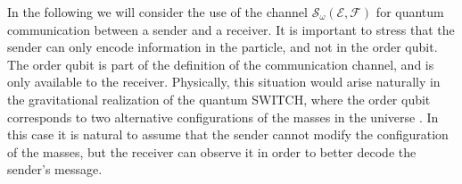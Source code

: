 \documentclass[aps,prl,twocolumn,superscriptaddress,groupedaddress]{revtex4}
\def\>{\rangle}
\def\<{\langle}
\newcommand{\ketbra}[2]{|#1\rangle\langle #2|}
\newcommand{\map}[1]{\mathcal{#1}}
\begin{document}

In the following we will consider the use of the channel $\map S_{\omega} (\map E, \map F)$ for quantum communication between a sender and a receiver.  It is important to stress that the sender can only encode information in the particle, and not in the order qubit. The order qubit is part of the definition of the communication channel, and is only available to the receiver.  Physically, this situation would arise naturally in  the gravitational realization of the quantum SWITCH, where the order qubit corresponds to two alternative configurations of the masses in the universe \cite{zych2017bell}. In this case it is natural to assume that the sender cannot modify  the configuration of the masses, but the receiver can observe it in order to better decode the sender's message. 



\end{document}

